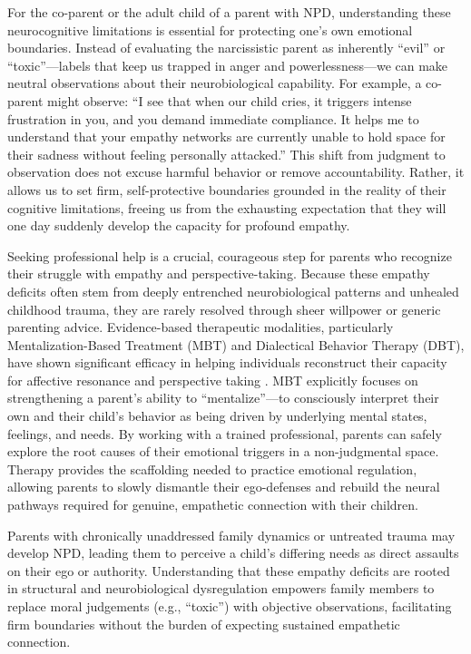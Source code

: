 For the co-parent or the adult child of a parent with NPD, understanding these neurocognitive limitations is essential for protecting one's own emotional boundaries.
Instead of evaluating the narcissistic parent as inherently ``evil'' or ``toxic''---labels that keep us trapped in anger and powerlessness---we can make neutral observations about their neurobiological capability.
For example, a co-parent might observe: ``I see that when our child cries, it triggers intense frustration in you, and you demand immediate compliance. 
It helps me to understand that your empathy networks are currently unable to hold space for their sadness without feeling personally attacked.''
This shift from judgment to observation does not excuse harmful behavior or remove accountability.
Rather, it allows us to set firm, self-protective boundaries grounded in the reality of their cognitive limitations, freeing us from the exhausting expectation that they will one day suddenly develop the capacity for profound empathy.

Seeking professional help is a crucial, courageous step for parents who recognize their struggle with empathy and perspective-taking. 
Because these empathy deficits often stem from deeply entrenched neurobiological patterns and unhealed childhood trauma, they are rarely resolved through sheer willpower or generic parenting advice. 
Evidence-based therapeutic modalities, particularly Mentalization-Based Treatment (MBT) and Dialectical Behavior Therapy (DBT), have shown significant efficacy in helping individuals reconstruct their capacity for affective resonance and perspective taking \citep{bateman2024, linehan2014}. 
MBT explicitly focuses on strengthening a parent's ability to ``mentalize''---to consciously interpret their own and their child's behavior as being driven by underlying mental states, feelings, and needs. 
By working with a trained professional, parents can safely explore the root causes of their emotional triggers in a non-judgmental space. 
Therapy provides the scaffolding needed to practice emotional regulation, allowing parents to slowly dismantle their ego-defenses and rebuild the neural pathways required for genuine, empathetic connection with their children.

\begin{keyinsight}
Parents with chronically unaddressed family dynamics or untreated trauma may develop NPD, leading them to perceive a child's differing needs as direct assaults on their ego or authority.
Understanding that these empathy deficits are rooted in structural and neurobiological dysregulation empowers family members to replace moral judgements (e.g., ``toxic'') with objective observations, facilitating firm boundaries without the burden of expecting sustained empathetic connection.
\end{keyinsight}


